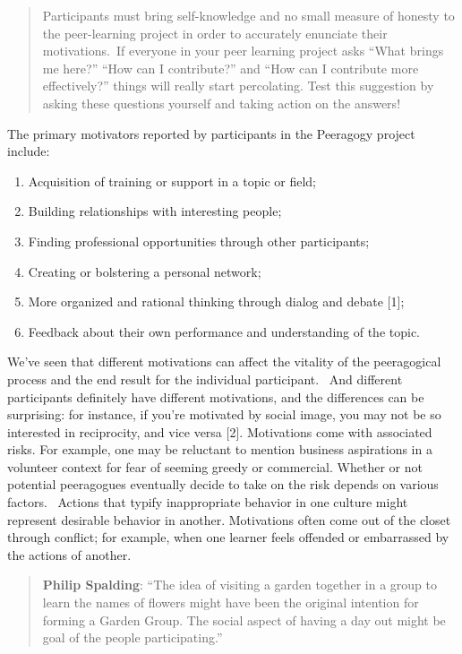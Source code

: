\begin{quote}
Participants must bring self-knowledge and no small measure of honesty
to the peer-learning project in order to accurately enunciate their
motivations.~If everyone in your peer learning project asks ``What
brings me here?'' ``How can I contribute?'' and ``How can I contribute
more effectively?'' things will really start percolating. Test this
suggestion by asking these questions yourself and taking action on the
answers!
\end{quote}

The primary motivators reported by participants in the Peeragogy project
include:

\begin{enumerate}
\itemsep1pt\parskip0pt
\item
  Acquisition of training or support in a topic or field;
\item
  Building relationships with interesting people;
\item
  Finding professional opportunities through other participants;
\item
  Creating or bolstering a personal network;
\item
  More organized and rational thinking through dialog and debate {[}1{]};
\item
  Feedback about their own performance and understanding of the topic.
\end{enumerate}

We've seen that different motivations can affect the vitality of the
peeragogical process and the end result for the individual participant.~
And different participants definitely have different motivations, and
the differences can be surprising: for instance, if you're motivated by
social image, you may not be so interested in reciprocity, and vice
versa {[}2{]}. Motivations come with associated risks. For example, one
may be reluctant to mention business aspirations in a volunteer context
for fear of seeming greedy or commercial. Whether or not potential
peeragogues eventually decide to take on the risk depends on various
factors.~ Actions that typify inappropriate behavior in one culture
might represent desirable behavior in another. Motivations often come
out of the closet through conflict; for example, when one learner feels
offended or embarrassed by the actions of another.

\begin{quote}
\textbf{Philip Spalding}: ``The idea of visiting a garden together in
a group to learn the names of flowers might have been the original
intention for forming a Garden Group. The social aspect of having a
day out might be goal of the people participating.''
\end{quote}

